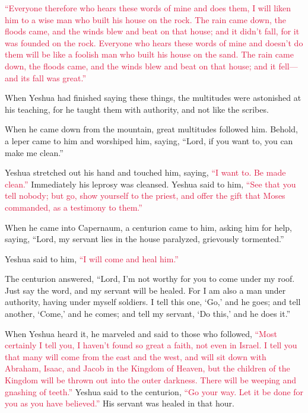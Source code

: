 \myverse{}\textcolor{crimson}{“Everyone therefore who hears these words of mine and does
	them, I will liken him to a wise man who built his house on the rock.
}
\myverse{}\textcolor{crimson}{The rain came down, the floods came, and the winds blew and beat on that
	house; and it didn’t fall, for it was founded on the rock.
}
\myverse{}\textcolor{crimson}{Everyone who hears these words of mine and doesn’t do them will be like
	a foolish man who built his house on the sand.
}
\myverse{}\textcolor{crimson}{The rain came down, the floods came, and the winds blew and beat on that
	house; and it fell—and its fall was great.”}

\myverse{}When Yeshua had finished saying these things, the multitudes
were astonished at his teaching,
\myverse{}for he taught them with authority, and not like the scribes.


\mychapter{} \myverse*{}When he came down from the mountain, great multitudes followed
him.
\myverse{}Behold, a leper came to him and worshiped him, saying, “Lord, if you want to,
you can make me clean.”

\myverse{}Yeshua stretched out his hand and touched him, saying,
\textcolor{crimson}{“I want to. Be made clean.”} Immediately his leprosy was cleansed.
\myverse{}Yeshua said to him,
\textcolor{crimson}{“See that you tell nobody; but go, show yourself to the priest, and offer the gift that Moses commanded,
	as a testimony to them.”}

\myverse{}When he came into Capernaum, a centurion came to him, asking him
for help,
\myverse{}saying, “Lord, my servant lies in the house paralyzed, grievously tormented.”

\myverse{}Yeshua said to him,
\textcolor{crimson}{“I will come and heal him.”}

\myverse{}The centurion answered, “Lord, I’m not worthy for you to come under
my roof. Just say the word, and my servant will be healed.
\myverse{}For I am also a man under authority, having under myself soldiers. I tell this
one, ‘Go,’ and he goes; and tell another, ‘Come,’ and he comes; and tell my servant, ‘Do this,’ and he
does it.”

\myverse{}When Yeshua heard it, he marveled and said to those who followed,
\textcolor{crimson}{“Most certainly I tell you, I haven’t found so great a faith, not even in Israel.
}
\myverse{}\textcolor{crimson}{I tell you that many will come from the east and the west, and will sit
	down with Abraham, Isaac, and Jacob in the Kingdom of Heaven,
}
\myverse{}\textcolor{crimson}{but the children of the Kingdom will be thrown out into the outer darkness.
	There will be weeping and gnashing of teeth.”}
\myverse{}Yeshua said to the centurion,
\textcolor{crimson}{“Go your way. Let it be done for you as you have believed.”} His servant was healed in that hour.


